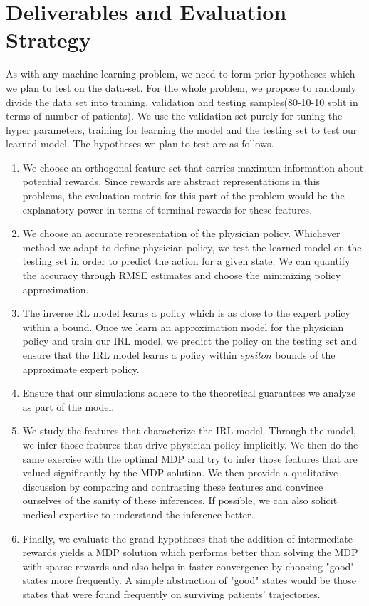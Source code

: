 \documentclass[twoside,11pt]{article}
\begin{document}
\section{Deliverables and Evaluation Strategy}
As with any machine learning problem, we need to form prior hypotheses which we plan to test on the data-set. For the whole problem, we propose to randomly divide the data set into training, validation and testing samples(80-10-10 split in terms of number of patients). We use the validation set purely for tuning the hyper parameters, training for learning the model and the testing set to test our learned model. The hypotheses we plan to test are as follows.
\begin{enumerate}
\item We choose an orthogonal feature set that carries maximum information about potential rewards. Since rewards are abstract representations in this problems, the evaluation metric for this part of the problem would be the explanatory power in terms of terminal rewards for these features.
\item We choose an accurate representation of the physician policy. Whichever method we adapt to define physician policy, we test the learned model on the testing set in order to predict the action for a given state. We can quantify the accuracy through RMSE estimates and choose the minimizing policy approximation.
\item The inverse RL model learns a policy which is as close to the expert policy within a bound. Once we learn an approximation model for the physician policy and train our IRL model, we predict the policy on the testing set and ensure that the IRL model learns a policy within $epsilon$ bounds of the approximate expert policy.
\item Ensure that our simulations adhere to the theoretical guarantees we analyze as part of the model.
\item We study the features that characterize the IRL model. Through the model, we infer those features that drive physician policy implicitly. We then do the same exercise with the optimal MDP and try to infer those features that are valued significantly by the MDP solution. We then provide a qualitative discussion by comparing and contrasting these features and convince ourselves of the sanity of these inferences. If possible, we can also solicit medical expertise to understand the inference better.
\item Finally, we evaluate the grand hypotheses that the addition of intermediate rewards yields a MDP solution which performs better than solving the MDP with sparse rewards and also helps in faster convergence by choosing "good" states more frequently. A simple abstraction of "good" states would be those states that were found frequently on surviving patients' trajectories.
\end{enumerate} 
\end{document}
